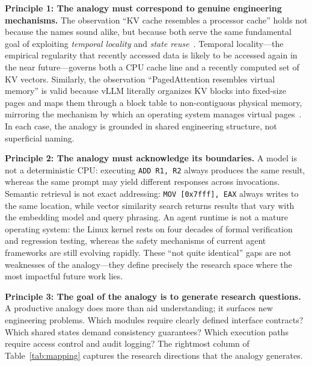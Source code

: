 \documentclass[11pt,a4paper]{article}
\begin{document}
\textbf{Principle 1: The analogy must correspond to genuine engineering mechanisms.}
The observation ``KV cache resembles a processor cache'' holds not because the names sound alike, but because both serve the same fundamental goal of exploiting \textit{temporal locality} and \textit{state reuse}~\cite{drepper2007memory,kwon2023pagedattention}.
Temporal locality---the empirical regularity that recently accessed data is likely to be accessed again in the near future---governs both a CPU cache line and a recently computed set of KV vectors.
Similarly, the observation ``PagedAttention resembles virtual memory'' is valid because vLLM literally organizes KV blocks into fixed-size pages and maps them through a block table to non-contiguous physical memory, mirroring the mechanism by which an operating system manages virtual pages~\cite{kwon2023pagedattention}.
In each case, the analogy is grounded in shared engineering structure, not superficial naming.

\textbf{Principle 2: The analogy must acknowledge its boundaries.}
A model is not a deterministic CPU: executing \texttt{ADD R1, R2} always produces the same result, whereas the same prompt may yield different responses across invocations.
Semantic retrieval is not exact addressing: \texttt{MOV [0x7fff], EAX} always writes to the same location, while vector similarity search returns results that vary with the embedding model and query phrasing.
An agent runtime is not a mature operating system: the Linux kernel rests on four decades of formal verification and regression testing, whereas the safety mechanisms of current agent frameworks are still evolving rapidly.
These ``not quite identical'' gaps are not weaknesses of the analogy---they define precisely the research space where the most impactful future work lies.

\textbf{Principle 3: The goal of the analogy is to generate research questions.}
A productive analogy does more than aid understanding; it surfaces new engineering problems.
Which modules require clearly defined interface contracts?
Which shared states demand consistency guarantees?
Which execution paths require access control and audit logging?
The rightmost column of Table~\ref{tab:mapping} captures the research directions that the analogy generates.
\end{document}
